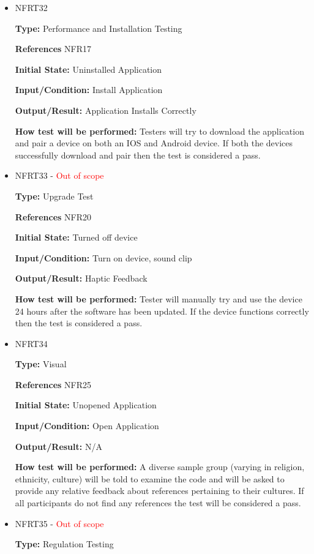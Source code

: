 \documentclass[12pt, titlepage]{article}
\begin{document}
\begin{itemize}
\item{NFRT32}

\textbf{Type:} Performance and Installation Testing

\textbf{References} NFR17
					
\textbf{Initial State:} Uninstalled Application
					
\textbf{Input/Condition:} Install Application
					
\textbf{Output/Result:} Application Installs Correctly
					
\textbf{How test will be performed:} Testers will try to download the application and pair a device on both an IOS and Android device. If both the devices successfully download and pair then the test is considered a pass. 

\item{NFRT33 - \textcolor{red}{Out of scope}}

\textbf{Type:} Upgrade Test

\textbf{References} NFR20
					
\textbf{Initial State:} Turned off device
					
\textbf{Input/Condition:} Turn on device, sound clip
					
\textbf{Output/Result:} Haptic Feedback
					
\textbf{How test will be performed:} Tester will manually try and use the device 24 hours after the software has been updated. If the device functions correctly then the test is considered a pass.

\item{NFRT34}

\textbf{Type:} Visual

\textbf{References} NFR25
					
\textbf{Initial State:} Unopened Application
					
\textbf{Input/Condition:} Open Application
					
\textbf{Output/Result:} N/A
					
\textbf{How test will be performed:} A diverse sample group (varying in religion, ethnicity, culture) will be told to examine the code and will be asked to provide any relative feedback about references pertaining to their cultures. If all participants do not find any references the test will be considered a pass. 

\item{NFRT35 - \textcolor{red}{Out of scope}} 

\textbf{Type:} Regulation Testing


\end{itemize}
\end{document}
